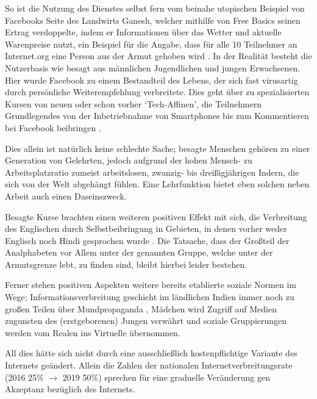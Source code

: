 \documentclass{article}
\begin{document}
So ist die Nutzung des Dienstes selbst fern vom beinahe utopischen Beispiel von Facebooks Seite des Landwirts Ganesh, welcher mithilfe von Free Basics seinen Ertrag verdoppelte, indem er Informationen über das Wetter und aktuelle Warenpreise nutzt, ein Beispiel für die Angabe, dass für alle 10 Teilnehmer an Internet.org eine Person aus der Armut gehoben wird \parencite[4]{prasad2017}.
In der Realität besteht die Nutzerbasis wie besagt aus männlichen Jugendlichen und jungen Erwachsenen.
Hier wurde Facebook zu einem Bestandteil des Lebens, der sich fast virusartig durch persönliche Weiterempfehlung verbreitete.
Dies geht über zu spezialisierten Kursen von neuen oder schon vorher `Tech-Affinen', die Teilnehmern Grundlegendes von der Inbetriebnahme von Smartphones bis zum Kommentieren bei Facebook beibringen \parencite{empowermentThroughFacebook}.

\medskip

Dies allein ist natürlich keine schlechte Sache; besagte Menschen gehören zu einer Generation von Gelehrten, jedoch aufgrund der hohen Mensch- zu Arbeitsplatzratio zumeist arbeitslosen, zwanzig- bis dreißigjährigen Indern, die sich von der Welt abgehängt fühlen.
Eine Lehrfunktion bietet eben solchen neben Arbeit auch einen Daseinszweck.

\medskip

Besagte Kurse brachten einen weiteren positiven Effekt mit sich, die Verbreitung des Englischen durch Selbstbeibringung in Gebieten, in denen vorher weder Englisch noch Hindi gesprochen wurde \parencite{empowermentThroughFacebook}. Die Tatsache, dass der Großteil der Analphabeten vor Allem unter der genannten Gruppe, welche unter der Armutsgrenze lebt, zu finden sind, bleibt hierbei leider bestehen.

\medskip

Ferner stehen positiven Aspekten weitere bereits etablierte soziale Normen im Wege; Informationsverbreitung geschieht im ländlichen Indien immer noch zu großen Teilen über Mundpropaganda \parencite[259]{everydayLife}, Mädchen wird Zugriff auf Medien zugunsten des (erstgeborenen) Jungen verwährt \parencite{empowermentThroughFacebook} und soziale Gruppierungen werden vom Realen ins Virtuelle übernommen.

\medskip

All dies hätte sich nicht durch eine ausschließlich kostenpflichtige Variante des Internets geändert.
Allein die Zahlen der nationalen Internetverbreitungsrate (2016 25\% $\to$ 2019 50\%) sprechen für eine graduelle Veränderung gen Akzeptanz bezüglich des Internets.
\end{document}
